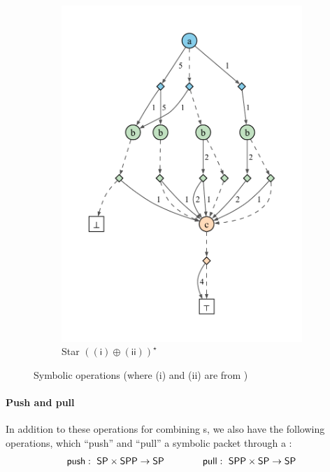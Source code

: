\documentclass[acmsmall,dvipsnames,nonacm]{acmart}
\begin{document}
\begin{figure}
\begin{subfigure}[b]{0.39\textwidth}
        \includegraphics[scale=0.5]{viz/spp1xor2star.pdf}
        \caption{Star $((\mathsf{i}) \oplus (\mathsf{ii}))^\star$}
        \label{fig:spp1xor2star}
    \end{subfigure}
    \caption{Symbolic operations (where (i) and (ii) are from )}
    \label{fig:symt2}
\end{figure}

\paragraph{Push and pull}
In addition to these operations for combining \SPPn{}s, we also have
the following operations, which ``push'' and ``pull'' a symbolic
packet through a \SPPn:
\begin{align*}
    \mathsf{push} :\ \mathsf{SP} \times \mathsf{SPP} \to \mathsf{SP} \qquad\qquad
    \mathsf{pull} :\ \mathsf{SPP} \times \mathsf{SP} \to \mathsf{SP}
\end{align*}
\end{document}
